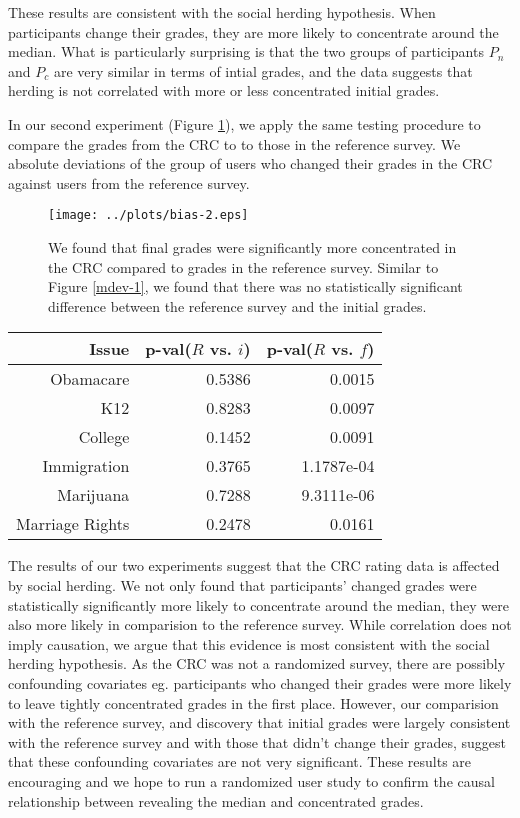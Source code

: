 These results are consistent with the social herding hypothesis.
When participants change their grades, they are more likely to concentrate around the median.
What is particularly surprising is that the two groups of participants $P_n$ and $P_c$ are very similar in terms of intial grades, and the data suggests that herding is not correlated with more or less concentrated initial grades.

In our second experiment (Figure \ref{mdev-2}), we apply the same testing procedure to compare the grades from the CRC to to those in the reference survey.
We absolute deviations of the group of users who changed their grades in the CRC against users from the reference survey.
\begin{figure}[h]
  \centering
    \texttt{[image: ../plots/bias-2.eps]}
      \caption{We found that final grades were significantly more concentrated in the CRC compared to grades in the reference survey. Similar to Figure \ref{mdev-1}, we found that there was no statistically significant difference between the reference survey and the initial grades.}
      \label{mdev-2}
\end{figure}

\begin{tabular}[!ht] { r | r | r }
\label{ref-1}
  Issue & p-val($R$ vs. $i$) & p-val($R$ vs. $f$) \\
  \hline
  \hline
  Obamacare &  0.5386 & 0.0015 \\
  \hline
  K12 & 0.8283 & 0.0097 \\
  \hline
  College & 0.1452 & 0.0091 \\
  \hline
  Immigration & 0.3765 & 1.1787e-04\\
  \hline
  Marijuana & 0.7288 & 9.3111e-06\\
  \hline
  Marriage Rights & 0.2478 & 0.0161 \\
\end{tabular}

The results of our two experiments suggest that the CRC rating data is affected by social herding.
We not only found that participants' changed grades were statistically significantly more likely to concentrate around the median, they were also more likely in comparision to the reference survey.
While correlation does not imply causation, we argue that this evidence is most consistent with the social herding hypothesis.
As the CRC was not a randomized survey, there are possibly confounding covariates eg. participants who changed their grades were more likely to leave tightly concentrated grades in the first place.
However, our comparision with the reference survey, and discovery that initial grades were largely consistent with the reference survey and with those that didn't change their grades, suggest that these confounding covariates are not very significant.
These results are encouraging and we hope to run a randomized user study to confirm the causal relationship between revealing the median and concentrated grades.

